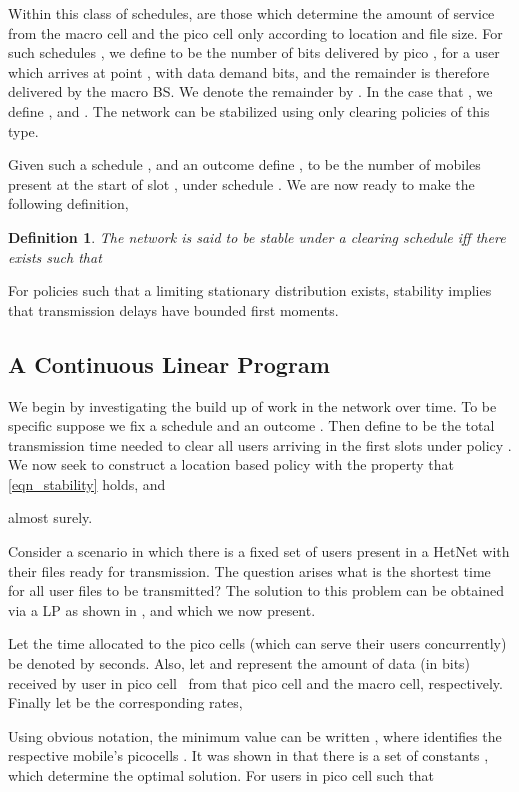 \documentclass[12pt, draftcls, onecolumn]{IEEEtranTCOM}
\newtheorem{definition}{Definition}
\begin{document}
Within this class of schedules, are those which determine the amount of service from the macro cell and the pico cell only according to location and file size. For such schedules ,  we define
  to be the number of bits delivered by  pico , for a user which  arrives at point , with data demand  bits, and the remainder is therefore delivered by the macro BS. We denote the remainder by . In the case that , we define , and . The network can be stabilized using only clearing policies of this type.

Given such a schedule ,  and an outcome   define , to
be the number of mobiles present at the start of slot , under schedule . We are now ready to make the following definition,
\begin{definition}
The network is said to be {\em stable} under a clearing schedule  iff there exists  such that

\end{definition}

For policies  such that a limiting stationary distribution exists, stability implies that transmission delays have bounded first moments.


\subsection{A Continuous Linear Program}
\label{sec_ctsLP}
We begin by investigating the build up of work in the network over time.
To be specific suppose we fix a schedule  and an outcome . Then
define  to be the total transmission time needed to clear all users arriving in the
first  slots under policy . We now seek to construct a
location based policy  with the property that \eqref{eqn_stability} holds, and

almost surely. 

Consider a scenario in which there is a fixed set of users present in a HetNet with their files ready for transmission. The question arises what is the shortest time for all user files to be transmitted? The solution to this problem can be obtained via a LP as shown in \cite{ICC2013}, and which we now
present.

Let the time allocated to the pico cells (which can serve their users concurrently) be denoted by  seconds.
Also, let  and  represent the amount of data (in bits)
received by user  in pico cell~
from that pico cell and the macro cell, respectively. Finally let  be the corresponding
rates,

Using obvious notation, the minimum value can be written , where  identifies the respective mobile's picocells . It was shown in
\cite{ICC2013} that there is a set of constants
, which determine the optimal solution. For users in pico cell 
such that
\end{document}

